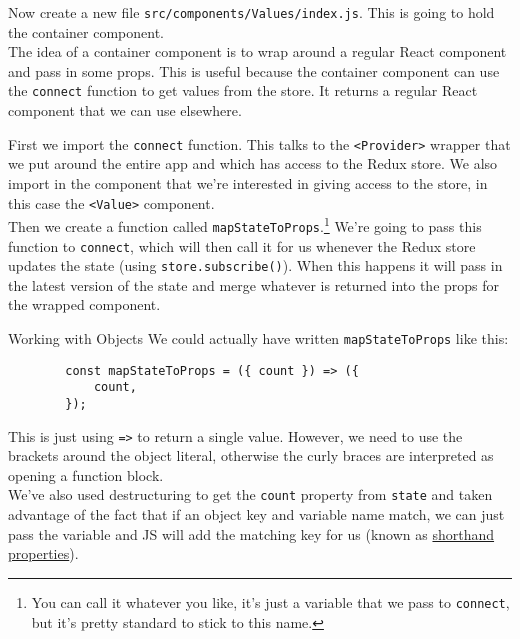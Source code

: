 Now create a new file \texttt{src/components/Values/index.js}. This is going to hold the container component.
\\

The idea of a container component is to wrap around a regular React component and pass in some props. This is useful because the container component can use the \texttt{connect} function to get values from the store. It returns a regular React component that we can use elsewhere.


First we import the \texttt{connect} function. This talks to the \texttt{<Provider>} wrapper that we put around the entire app and which has access to the Redux store. We also import in the component that we're interested in giving access to the store, in this case the \texttt{<Value>} component.
\\

Then we create a function called \texttt{mapStateToProps}.\footnote{You can call it whatever you like, it's just a variable that we pass to \texttt{connect}, but it's pretty standard to stick to this name.} We're going to pass this function to \texttt{connect}, which will then call it for us whenever the Redux store updates the state (using \texttt{store.subscribe()}). When this happens it will pass in the latest version of the state and merge whatever is returned into the props for the wrapped component.
\\



\par\bigskip


\pagebreak

\begin{infobox}{Working with Objects}
    We could actually have written \texttt{mapStateToProps} like this:

    \begin{verbatim}
        const mapStateToProps = ({ count }) => ({
            count,
        });
    \end{verbatim}

    This is just using \texttt{=>} to return a single value. However, we need to use the brackets around the object literal, otherwise the curly braces are interpreted as opening a function block.
    \\

    We've also used destructuring to get the \texttt{count} property from \texttt{state} and taken advantage of the fact that if an object key and variable name match, we can just pass the variable and JS will add the matching key for us (known as \href{https://ariya.io/2013/02/es6-and-object-literal-property-value-shorthand}{shorthand properties}).
\end{infobox}

